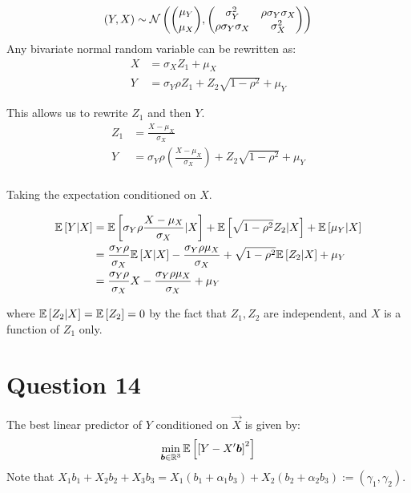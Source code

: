\documentclass[12pt]{paper}
\begin{document}
\begin{equation*}
  (Y,X) \sim \mathcal{N} \left( \binom{\mu_Y}{\mu_X},
    \begin{pmatrix}
      \sigma_Y^2 & \rho \sigma_Y \sigma_X\\
      \rho \sigma_Y \sigma_X & \sigma_X^2
    \end{pmatrix}
  \right)
\end{equation*}
Any bivariate normal random variable can be rewritten as:
\begin{align*}
  X &= \sigma_X Z_1 + \mu_X\\
  Y &= \sigma_Y \rho Z_1 + Z_2 \sqrt{ 1 - \rho^2} + \mu_Y
\end{align*}

This allows us to rewrite $Z_1$ and then $Y$.
\begin{align*}
  Z_1 &= \frac{X - \mu_X}{\sigma_X}\\
  Y &= \sigma_Y \rho \left( \frac{X - \mu_X}{\sigma_X} \right) + Z_2\sqrt{ 1 - \rho^2} + \mu_Y\\
\end{align*}

Taking the expectation conditioned on $X$.

\begin{align*}
  \mathbb{E} \left [ Y \vert X \right ] &= \mathbb{E} \left [  \sigma_Y \rho \frac{X - \mu_X}{\sigma_X} \vert X \right ] + \mathbb{E} \left [  \sqrt{ 1 - \rho^2}
            Z_2 \vert X \right ] + \mathbb{E} \left [ \mu_Y \vert X \right ]\\
  &= \frac{\sigma_Y \rho}{\sigma_X} \mathbb{E} \left [ X \vert X \right ] - \frac{\sigma_Y \rho \mu_X}{\sigma_X} + \sqrt{ 1
    - \rho^2} \mathbb{E} \left [  Z_2 \vert X \right ] + \mu_Y\\
  &= \frac{\sigma_Y \rho}{\sigma_X} X - \frac{\sigma_Y \rho \mu_X}{\sigma_X} + \mu_Y
\end{align*}

where $\mathbb{E} \left [ Z_2 \vert X \right ] = \mathbb{E} \left [ Z_2 \right ] = 0$ by the fact that $Z_1, Z_2$ are
independent, and $X$ is a function of $Z_1$ only.


\section{Question 14}
The best linear predictor of $Y$ conditioned on $\vec{X}$ is given by:
\begin{equation*}
  \min_{\bm{ b } \in \mathbb{R}^3} \mathbb{E} \left [  \left [ Y - X' \bm{ b } \right ]^2 \right ]
\end{equation*}
Note that $X_1 b_1 + X_2 b_2 + X_3 b_3 = X_1 \left( b_1
  + \alpha_1 b_3 \right) + X_2 \left( b_2 + \alpha_2 b_3  \right) := ( \gamma_1, \gamma_2)$. 
\end{document}
